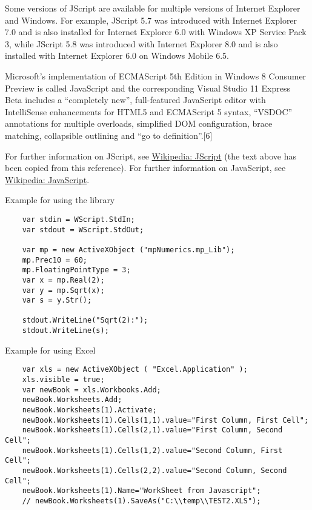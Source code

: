 	\vpara
	Some versions of JScript are available for multiple versions of Internet Explorer and Windows. For example, JScript 5.7 was introduced with Internet Explorer 7.0 and is also installed for Internet Explorer 6.0 with Windows XP Service Pack 3, while JScript 5.8 was introduced with Internet Explorer 8.0 and is also installed with Internet Explorer 6.0 on Windows Mobile 6.5.
	
	\vpara
	Microsoft's implementation of ECMAScript 5th Edition in Windows 8 Consumer Preview is called JavaScript and the corresponding Visual Studio 11 Express Beta includes a “completely new”, full-featured JavaScript editor with IntelliSense enhancements for HTML5 and ECMAScript 5 syntax, “VSDOC” annotations for multiple overloads, simplified DOM configuration, brace matching, collapsible outlining and “go to definition”.[6]
	
	\vpara
	For further information on JScript, see \href{http://en.wikipedia.org/wiki/JScript}{Wikipedia: JScript} (the text above has been copied from this reference).
	For further information on JavaScript, see \href{http://en.wikipedia.org/wiki/JavaScript}{Wikipedia: JavaScript}.
	
	
	\vpara
	Example for using the library
	
	\begin{lstlisting}
	var stdin = WScript.StdIn;
	var stdout = WScript.StdOut;
	
	var mp = new ActiveXObject ("mpNumerics.mp_Lib");
	mp.Prec10 = 60;
	mp.FloatingPointType = 3;
	var x = mp.Real(2);
	var y = mp.Sqrt(x);
	var s = y.Str();
	
	stdout.WriteLine("Sqrt(2):");
	stdout.WriteLine(s);
	\end{lstlisting}
	
	
	\vpara
	Example for using Excel
	
	\begin{lstlisting}
	var xls = new ActiveXObject ( "Excel.Application" );
	xls.visible = true;
	var newBook = xls.Workbooks.Add;
	newBook.Worksheets.Add;
	newBook.Worksheets(1).Activate;
	newBook.Worksheets(1).Cells(1,1).value="First Column, First Cell";
	newBook.Worksheets(1).Cells(2,1).value="First Column, Second Cell";
	newBook.Worksheets(1).Cells(1,2).value="Second Column, First Cell";
	newBook.Worksheets(1).Cells(2,2).value="Second Column, Second Cell";
	newBook.Worksheets(1).Name="WorkSheet from Javascript";
	// newBook.Worksheets(1).SaveAs("C:\\temp\\TEST2.XLS");
	\end{lstlisting}
	
